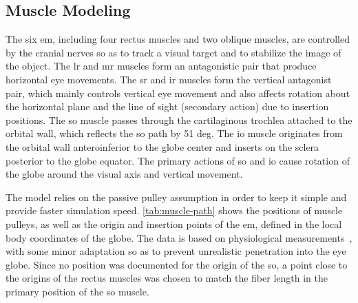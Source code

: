 \documentclass[11pt,a4paper,draft=false]{report}
\begin{document}
\subsection*{Muscle Modeling}\label{sec:muscle-modeling}

The six \gls{em}, including four rectus muscles and two oblique muscles, are
controlled by the cranial nerves so as to track a visual target and to stabilize
the image of the object. The \gls{lr} and \gls{mr} muscles form an antagonistic
pair that produce horizontal eye movements. The \gls{sr} and \gls{ir} muscles
form the vertical antagonist pair, which mainly controls vertical eye movement
and also affects rotation about the horizontal plane and the line of sight
(secondary action) due to insertion positions. The \gls{so} muscle passes
through the cartilaginous trochlea attached to the orbital wall, which reflects
the \gls{so} path by 51 deg. The \gls{io} muscle originates from the orbital
wall anteroinferior to the globe center and inserts on the sclera posterior to
the globe equator. The primary actions of \gls{so} and \gls{io} cause rotation
of the globe around the visual axis and vertical movement.

The model relies on the passive pulley assumption in order to keep it simple and
provide faster simulation speed. \autoref{tab:muscle-path} shows the positions
of muscle pulleys, as well as the origin and insertion points of the \gls{em},
defined in the local body coordinates of the globe. The data is based on
physiological measurements~\cite{Iskander2018}, with some minor adaptation so as
to prevent unrealistic penetration into the eye globe. Since no position was
documented for the origin of the \gls{so}, a point close to the origins of the
rectus muscles was chosen to match the fiber length in the primary position of
the \gls{so} muscle.
\end{document}
